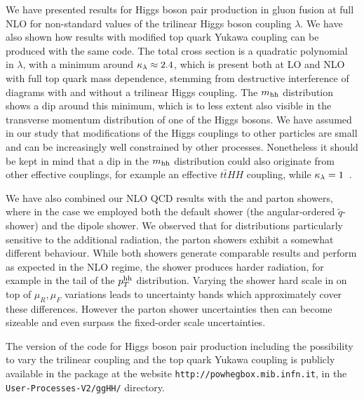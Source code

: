 We have presented results for Higgs boson pair production in gluon
fusion at full NLO for non-standard values of the trilinear Higgs
boson coupling $\lambda$. We have also shown how results with modified 
top quark Yukawa coupling can be produced with the same code.
The total cross section is a quadratic
polynomial in $\lambda$, with a minimum around $\kappa_{\lambda}\approx 2.4$,
which is present both at LO and NLO with full top quark mass
dependence, stemming from destructive interference of diagrams with
and without a trilinear Higgs coupling. 
The $m_{\mathrm{hh}}$ distribution shows a dip around this minimum, which is to
less extent also visible in the transverse momentum distribution of
one of the Higgs bosons. 
We have assumed in our study that modifications of the Higgs couplings
to other particles are small and can be increasingly well constrained by
other processes. Nonetheless it should be kept in mind that a dip in
the $m_{\mathrm{hh}}$ distribution could also originate from other effective
couplings, for example an effective $t\bar{t}HH$ coupling, while
$\kappa_{\lambda}= 1$~\cite{Buchalla:2018yce}.

We have also combined our NLO QCD results with the \pythia and \herwig
parton showers, where in the \herwig case we employed both the default 
shower (the angular-ordered $\tilde{q}$-shower) and the dipole shower.
We observed that for distributions particularly sensitive to the 
additional radiation, the parton showers exhibit a somewhat different 
behaviour. While both \herw showers generate comparable results and 
perform as expected in the NLO regime, the \pythia shower produces harder 
radiation, for example in the tail of the $p_T^{\mathrm{hh}}$
distribution. Varying the shower hard scale in \herwig on top of
$\mu_R,\mu_F$ variations leads to
uncertainty bands which approximately cover these 
differences. However the parton shower uncertainties 
then can become sizeable and even surpass the fixed-order scale uncertainties.

The \powheg{} version of the code for Higgs boson pair production
including the possibility to vary the trilinear coupling 
and the top quark Yukawa coupling 
is publicly available in the  package at the website
{\tt http://powhegbox.mib.infn.it}, in the
{\tt User-Processes-V2/ggHH/} directory.
